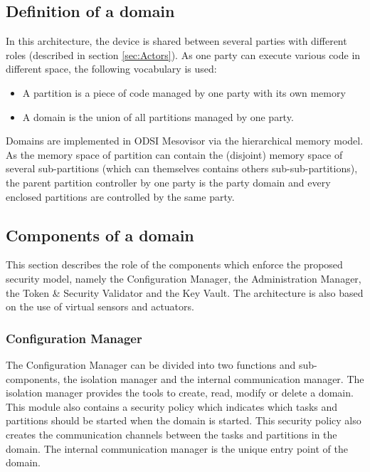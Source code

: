 \documentclass[conference]{IEEEtran}
\begin{document}
\subsection{Definition of a domain}
\label{sec:Domain_def}
In this architecture, the device is shared between several parties with different roles (described in section \ref{sec:Actors}). As one party can execute various code in different space, the following vocabulary is used:
\begin{itemize}
    \item A partition is a piece of code managed by one party with its own memory
    \item A domain is the union of all partitions managed by one party.
\end{itemize}
Domains are implemented in ODSI Mesovisor via the hierarchical memory model. As the memory space of partition can contain the (disjoint) memory space of several sub-partitions (which can themselves contains others sub-sub-partitions), the parent partition controller by one party is the party domain and every enclosed partitions are controlled by the same party.


\subsection{Components of a domain}
\label{sec:Domain_comp}
This section describes the role of the components which enforce the proposed security model, namely the Configuration Manager, the Administration Manager, the Token \& Security Validator and the Key Vault. The architecture is also based on the use of virtual sensors and actuators. 

\subsubsection{Configuration Manager}
\label{sec:Config_Mgr}
The Configuration Manager can be divided into two functions and sub-components, the isolation manager and the internal communication manager. The isolation manager provides the tools to create, read, modify or delete a domain. This module also contains a security policy which indicates which tasks and partitions should be started when the domain is started. This security policy also creates the communication channels between the tasks and partitions in the domain. The internal communication manager is the unique entry point of the domain. 
\end{document}
